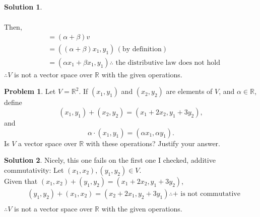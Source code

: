 \documentclass[10pt]{article}
\theoremstyle{definition}
\newtheorem{problem}{Problem}
\newtheorem{soln}{Solution}
\begin{document}
\begin{soln}
\begin{enumerate}[label=(\roman*)]
\begin{align*}
          \end{align*}
          Then,
          \begin{align*}
             & = (\alpha+\beta)v                                                                   \\
             & = ((\alpha+\beta)x_1, y_1)\, (\text{by definition} )                                \\
             & = (\alpha x_1+\beta x_1, y_1) \therefore \text{ the distributive law does not hold}
          \end{align*}
          $\therefore V$ is not a vector space over $\mathbb{R}$ with the given operations.
  \end{enumerate}
\end{soln}

\begin{problem}
Let $V=\mathbb{R}^2$. If $(x_1,y_1)$ and $(x_2,y_2)$ are elements of $V$, and $\alpha\in\mathbb{R}$, define
$$(x_1,y_1)+(x_2,y_2)=(x_1+2x_2, y_1+3y_2),$$
and
$$\alpha\cdot(x_1,y_1) = (\alpha x_1,\alpha y_1).$$
Is $V$ a vector space over $\mathbb{R}$ with these operations? Justify your answer.
\end{problem}
\begin{soln}
  Nicely, this one fails on the first one I checked, additive commutativity:
  Let $(x_1, x_2), (y_1, y_2)\in V$. \\
  Given that $(x_1, x_2) + (y_1, y_2) = (x_1+2x_2, y_1+3y_2)$,
  \begin{align*}
     & (y_1, y_2) + (x_1, x_2) = (x_2+2x_1, y_2+3y_1) \therefore + \text{ is not commutative} \\
  \end{align*}
  $\therefore V$ is not a vector space over $\mathbb{R}$ with the given operations.
\end{soln}
\end{document}
